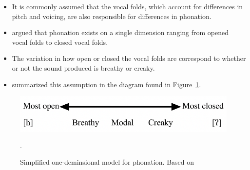 \documentclass[12pt, letterpaper]{article}
\begin{document}
\begin{itemize}
	\item It is commonly assumed that the vocal folds, which account for differences in pitch and voicing, are also responsible for differences in phonation. 
	\item \citet{ladefogedPreliminariesLinguisticPhonetics1971,gordonPhonationTypesCrosslinguistic2001} argued that phonation exists on a single dimension ranging from opened vocal folds to closed vocal folds. 
	\item The variation in how open or closed the vocal folds are correspond to whether or not the sound produced is breathy or creaky. 
	\item \citet{ladefogedPreliminariesLinguisticPhonetics1971,gordonPhonationTypesCrosslinguistic2001} summarized this assumption in the diagram found in Figure~\ref{fig:Phonation}.
\end{itemize}
\vspace{-2ex}
\begin{figure}[!h]
	\centering
	\includegraphics[width=.6\textwidth]{../Phonation.png}
	\caption{Simplified one-deminsional model for phonation. Based on \citet{ladefogedPreliminariesLinguisticPhonetics1971,gordonPhonationTypesCrosslinguistic2001}}.
	\label{fig:Phonation}
\end{figure}
\vspace{-2ex}
\end{document}
